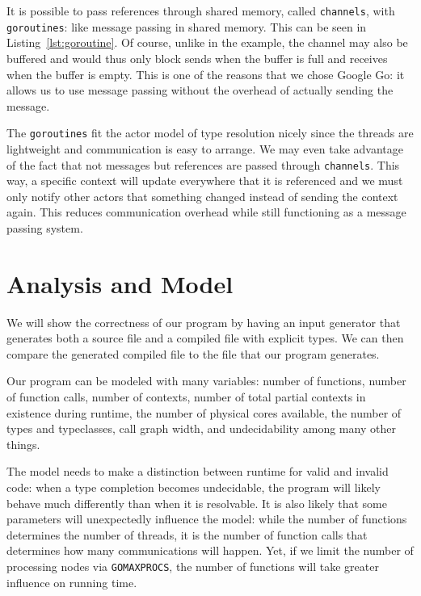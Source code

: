 \documentclass{acm_proc_article-sp}
\begin{document}
It is possible to pass references through shared memory, called
\texttt{channels}, with \texttt{goroutines}: like message passing in shared
memory. This can be seen in Listing~\ref{lst:goroutine}. Of course, unlike in
the example, the channel may also be buffered and would thus only block sends
when the buffer is full and receives when the buffer is empty. This is one of
the reasons that we chose Google Go: it allows us to use message passing
without the overhead of actually sending the message.

The \texttt{goroutines} fit the actor model of type resolution nicely since
the threads are lightweight and communication is easy to arrange. We may even
take advantage of the fact that not messages but references are passed through
\texttt{channels}. This way, a specific context will update everywhere that it
is referenced and we must only notify other actors that something changed
instead of sending the context again. This reduces communication overhead while
still functioning as a message passing system.

\section{Analysis and Model}

We will show the correctness of our program by having an input generator that
generates both a source file and a compiled file with explicit types. We can
then compare the generated compiled file to the file that our program
generates. 

Our program can be modeled with many variables: number of functions, number of
function calls, number of contexts, number of total partial contexts in
existence during runtime, the number of physical cores available, the number of
types and typeclasses, call graph width, and undecidability among many other
things. 

The model needs to make a distinction between runtime for valid and invalid
code: when a type completion becomes undecidable, the program will likely
behave much differently than when it is resolvable. It is also likely that some
parameters will unexpectedly influence the model: while the number of functions
determines the number of threads, it is the number of function calls that
determines how many communications will happen. Yet, if we limit the number of
processing nodes via \texttt{GOMAXPROCS}, the number of functions will take
greater influence on running time.

\end{document}
